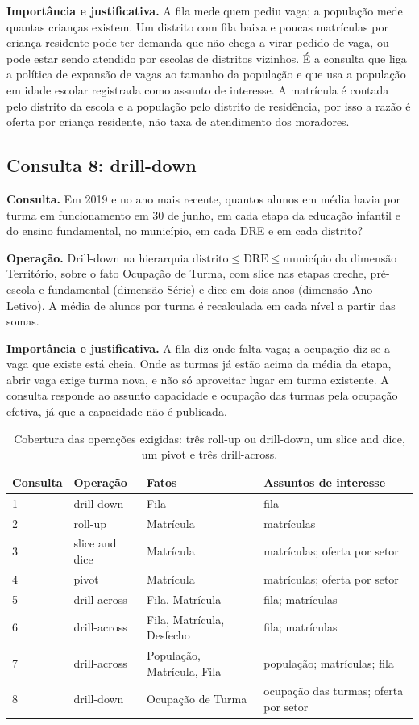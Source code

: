 \documentclass[11pt,a4paper]{article}
\newcommand{\hier}[1]{$#1$}
\begin{document}
\textbf{Importância e justificativa.} A fila mede quem pediu vaga; a população mede quantas crianças existem. Um distrito com fila baixa e poucas matrículas por criança residente pode ter demanda que não chega a virar pedido de vaga, ou pode estar sendo atendido por escolas de distritos vizinhos. É a consulta que liga a política de expansão de vagas ao tamanho da população e que usa a população em idade escolar registrada como assunto de interesse. A matrícula é contada pelo distrito da escola e a população pelo distrito de residência, por isso a razão é oferta por criança residente, não taxa de atendimento dos moradores.

\subsection{Consulta 8: drill-down}
\textbf{Consulta.} Em 2019 e no ano mais recente, quantos alunos em média havia por turma em funcionamento em 30 de junho, em cada etapa da educação infantil e do ensino fundamental, no município, em cada DRE e em cada distrito?

\textbf{Operação.} Drill-down na hierarquia \hier{\text{distrito} \leq \text{DRE} \leq \text{município}} da dimensão Território, sobre o fato Ocupação de Turma, com slice nas etapas creche, pré-escola e fundamental (dimensão Série) e dice em dois anos (dimensão Ano Letivo). A média de alunos por turma é recalculada em cada nível a partir das somas.

\textbf{Importância e justificativa.} A fila diz onde falta vaga; a ocupação diz se a vaga que existe está cheia. Onde as turmas já estão acima da média da etapa, abrir vaga exige turma nova, e não só aproveitar lugar em turma existente. A consulta responde ao assunto capacidade e ocupação das turmas pela ocupação efetiva, já que a capacidade não é publicada.

\begin{table}[H]\centering\small
\begin{tabular}{llll}
\toprule\textbf{Consulta} & \textbf{Operação} & \textbf{Fatos} & \textbf{Assuntos de interesse}\\\midrule
1 & drill-down & Fila & fila \\
2 & roll-up & Matrícula & matrículas \\
3 & slice and dice & Matrícula & matrículas; oferta por setor \\
4 & pivot & Matrícula & matrículas; oferta por setor \\
5 & drill-across & Fila, Matrícula & fila; matrículas \\
6 & drill-across & Fila, Matrícula, Desfecho & fila; matrículas \\
7 & drill-across & População, Matrícula, Fila & população; matrículas; fila \\
8 & drill-down & Ocupação de Turma & ocupação das turmas; oferta por setor \\
\bottomrule\end{tabular}
\caption{Cobertura das operações exigidas: três roll-up ou drill-down, um slice and dice, um pivot e três drill-across.}
\end{table}
\end{document}

